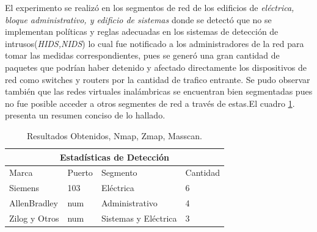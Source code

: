 \documentclass[jou,apacite]{apa6}
\begin{document}
El experimento se realizó en los segmentos de red de los edificios de \textit{eléctrica, bloque administrativo, y edificio de sistemas} donde se detectó que no se implementan políticas y reglas adecuadas en los sistemas de detección de intrusos(\textit{HIDS,NIDS}) lo cual fue notificado a los administradores de la red para tomar las medidas correspondientes, pues se generó una gran cantidad de paquetes que podrían haber detenido y afectado directamente los dispositivos de red como switches y routers por la cantidad de trafico entrante. Se pudo observar también que las redes virtuales inalámbricas se encuentran bien segmentadas pues no fue posible acceder a otros segmentes de red a través de estas.El cuadro \ref{table:prueba}.  presenta un resumen conciso de lo hallado.

\begin{table}[htb]
\centering
\begin{tabular}{| p{1.8cm}| p{1.1cm} |p{1.9cm}|p{1.2cm}|}
\hline
\multicolumn{4}{|c|}{Estadísticas de Detección} \\
\hline
Marca & Puerto & Segmento & Cantidad\\
\hline 
Siemens & 103 & Eléctrica & 6\\ \hline
AllenBradley & num  & Administrativo & 4\\ \hline
Zilog y Otros & num  & Sistemas y Eléctrica & 3 \\ \hline
\end{tabular}
\caption{Resultados Obtenidos, Nmap, Zmap, Masscan.}
\label{table:prueba}
\end{table}
\end{document}
